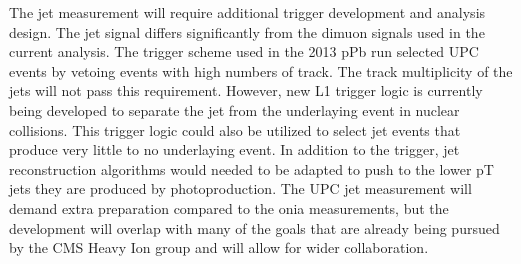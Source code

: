       The jet measurement will require additional trigger development and 
        analysis design. 
      The jet signal differs significantly from the dimuon signals used in the
        current analysis. 
      The trigger scheme used in the 2013 pPb run selected UPC events by 
        vetoing events with high numbers of track. 
      The track multiplicity of the jets will not pass this requirement. 
      However, new L1 trigger logic is currently being developed to separate 
        the jet from the underlaying event in nuclear collisions. 
      This trigger logic could also be utilized to select jet events that
        produce very little to no underlaying event. 
      In addition to the trigger, jet reconstruction algorithms would needed 
        to be adapted to push to the lower pT jets they are produced by 
        photoproduction. 
      The UPC jet measurement will demand extra preparation compared to the 
        onia measurements, but the development will overlap with many of the 
        goals that are already being pursued by the CMS Heavy Ion group and 
        will allow for wider collaboration. 

